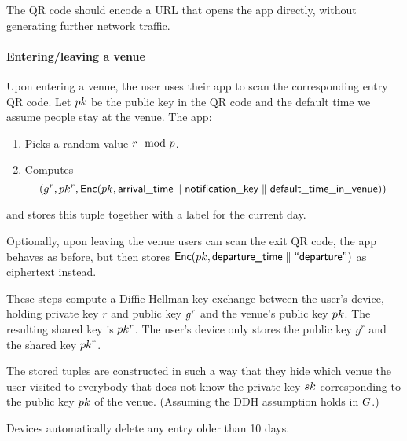The QR code should encode a URL that opens the app directly, without generating further network traffic.

\paragraph{Entering/leaving a venue} Upon entering a venue, the user uses their app to scan the corresponding entry QR code. Let $pk$ be the public key in the QR code and  the default time we assume people stay at the venue. The app:
\begin{enumerate}
\item Picks a random value $r \mod {p}$.
\item Computes 
  \begin{equation}
    (g^r, pk^r, \textsf{Enc}(pk, \textsf{arrival\_time} \parallel \textsf{notification\_key} \parallel \textsf{default\_time\_in\_venue}))
  \end{equation}
\end{enumerate}
and stores this tuple together with a label for the current day.

Optionally, upon leaving the venue users can scan the exit QR code, the app behaves as before, but then stores $\textsf{Enc}(pk, \textsf{departure\_time} \parallel \textsf{``departure''})$ as ciphertext instead.

These steps compute a Diffie-Hellman key exchange between the user’s device, holding private key $r$ and public key $g^r$ and the venue’s public key $pk$. The resulting shared key is $pk^r$. The user’s device only stores the public key $g^r$ and the shared key $pk^r$.

The stored tuples are constructed in such a way that they hide which venue the user visited to everybody that does not know the private key $sk$ corresponding to the public key $pk$ of the venue. (Assuming the DDH assumption holds in $G$.)

Devices automatically delete any entry older than 10 days.

